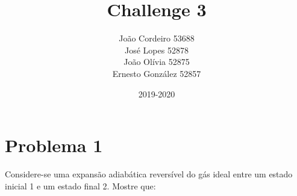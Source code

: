 \documentclass[12pt, twoside, a4paper]{article}
\begin{document}
\title{Challenge 3}
\author{João Cordeiro 53688\\José Lopes 52878\\João Olívia 52875\\Ernesto González 52857}
\date{2019-2020}
\maketitle

\section{Problema 1}
Considere-se uma expansão adiabática reversível do gás ideal entre um estado inicial 1 e um estado final 2. Mostre que:
\end{document}
